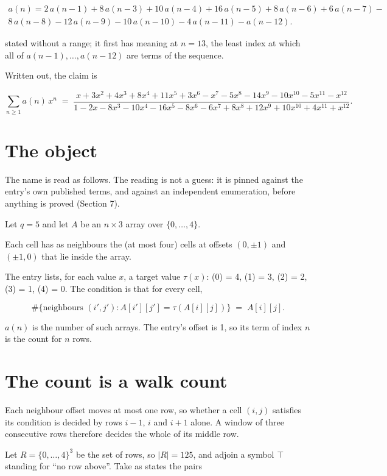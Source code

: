 \documentclass[11pt]{article}
\theoremstyle{definition}
\begin{document}
\begin{multline*} a(n) = 2\,a(n-1) + 8\,a(n-3) + 10\,a(n-4) + 16\,a(n-5) + 8\,a(n-6) + 6\,a(n-7) - \\ 8\,a(n-8) - 12\,a(n-9) - 10\,a(n-10) - 4\,a(n-11) - a(n-12). \end{multline*}

stated without a range; it first has meaning at $n = 13$, the least index at which all of $a(n-1),\dots,a(n-12)$ are terms of the sequence.

Written out, the claim is

\[\sum_{n \ge 1} a(n)\,x^n \;=\; \frac{x + 3x^{2} + 4x^{3} + 8x^{4} + 11x^{5} + 3x^{6} - x^{7} - 5x^{8} - 14x^{9} - 10x^{10} - 5x^{11} - x^{12}}{1 - 2x - 8x^{3} - 10x^{4} - 16x^{5} - 8x^{6} - 6x^{7} + 8x^{8} + 12x^{9} + 10x^{10} + 4x^{11} + x^{12}}.\]

\section{The object}

The name is read as follows. The reading is not a guess: it is pinned against the entry's own published terms, and against an independent enumeration, before anything is proved (Section 7).

Let $q = 5$ and let $A$ be an $n \times 3$ array over $\{0,\dots,4\}$.

Each cell has as neighbours the (at most four) cells at offsets $(0,\pm1)$ and $(\pm1,0)$ that lie inside the array.

The entry lists, for each value $x$, a target value $\tau(x)$: \tau(0) = 4, \tau(1) = 3, \tau(2) = 2, \tau(3) = 1, \tau(4) = 0. The condition is that for every cell,

\[\#\{\text{neighbours } (i',j') : A[i'][j'] = \tau(A[i][j])\} \;=\; A[i][j].\]

$a(n)$ is the number of such arrays. The entry's offset is 1, so its term of index $n$ is the count for $n$ rows.

\section{The count is a walk count}

Each neighbour offset moves at most one row, so whether a cell $(i,j)$ satisfies its condition is decided by rows $i-1$, $i$ and $i+1$ alone. A window of three consecutive rows therefore decides the whole of its middle row.

Let $R = \{0,\dots,4\}^{3}$ be the set of rows, so $|R| = 125$, and adjoin a symbol $\top$ standing for ``no row above''. Take as states the pairs
\end{document}
